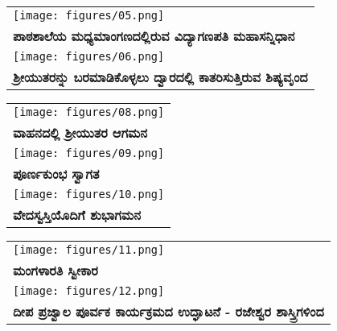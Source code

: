 {\tabcolsep=0pt
\noindent
\begin{tabular}{>{\centering}p{11cm}}
\texttt{[image: figures/05.png]}\\
\textbf{ಪಾಠಶಾಲೆಯ ಮಧ್ಯಮಾಂಗಣದಲ್ಲಿರುವ ವಿದ್ಯಾಗಣಪತಿ ಮಹಾಸನ್ನಿಧಾನ}\\[12pt]
\texttt{[image: figures/06.png]}\\
\textbf{ಶ್ರೀಯುತರನ್ನು ಬರಮಾಡಿಕೊಳ್ಳಲು ದ್ವಾರದಲ್ಲಿ ಕಾತರಿಸುತ್ತಿರುವ  ಶಿಷ್ಯವೃಂದ}
\end{tabular}
}

{\tabcolsep=0pt
\noindent
\begin{tabular}{>{\centering}p{11cm}}
\texttt{[image: figures/08.png]}\\
\textbf{ವಾಹನದಲ್ಲಿ ಶ್ರೀಯುತರ ಆಗಮನ}\\[12pt]
\texttt{[image: figures/09.png]}\\
\textbf{ಪೂರ್ಣಕುಂಭ ಸ್ವಾಗತ}\\[12pt]
\texttt{[image: figures/10.png]}\\
\textbf{ವೇದಸ್ವಸ್ತಿಯೊದಿಗೆ ಶುಭಾಗಮನ}
\end{tabular}
}

{\tabcolsep=0pt
\noindent
\begin{tabular}{>{\centering}p{11cm}}
\texttt{[image: figures/11.png]}\\
\textbf{ಮಂಗಳಾರತಿ ಸ್ವೀಕಾರ}\\[12pt]
\texttt{[image: figures/12.png]}\\
\textbf{ದೀಪ ಪ್ರಜ್ವಾಲ ಪೂರ್ವಕ ಕಾರ್ಯಕ್ರಮದ ಉದ್ಘಾಟನೆ - ರಜೇಶ್ವರ ಶಾಸ್ತ್ರಿಗಳಿಂದ}
\end{tabular}
}


